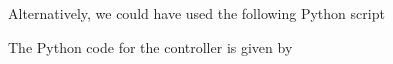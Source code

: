 Alternatively, we could have used the following Python script
%
%
\ifsolutionmanual



\else




\fi


The Python code for the controller is given by
%
%

\ifsolutionmanual



\else




\fi


